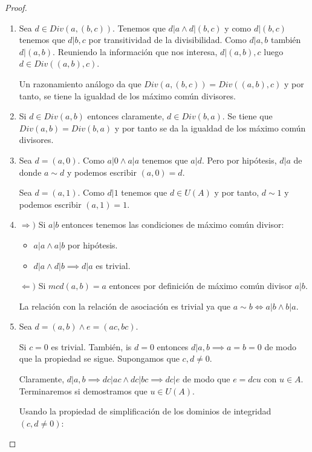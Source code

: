 \begin{proof}
	\begin{enumerate}
	\item Sea $d \in Div(a,(b,c))$. Tenemos que $d|a \land d|(b,c)$ y como $d|(b,c)$ tenemos que $d|b,c$ por transitividad de la divisibilidad. Como $d|a,b$ también $d|(a,b)$. Reuniendo la información que nos interesa, $d|(a,b),c$ luego $d \in Div((a,b),c)$. 
	
	Un razonamiento análogo da que $Div(a,(b,c)) = Div((a,b),c)$ y por tanto, se tiene la igualdad de los máximo común divisores. 
	 
	\item Si $d \in Div(a,b)$ entonces claramente, $d \in Div(b,a)$. Se tiene que $Div(a,b) = Div(b,a)$ y por tanto se da la igualdad de los máximo común divisores. 
	
	\item Sea $d = (a,0)$. Como $a|0 \land a|a$ tenemos que $a|d$. Pero por hipótesis, $d|a$ de donde $a \sim d$ y podemos escribir $(a,0) = d$. 
		
	Sea  $d = (a,1)$. Como $d|1$ tenemos que $d \in U(A)$ y por tanto, $d \sim 1$ y podemos escribir $(a,1) = 1$.
	
	\item $\Rightarrow)$ Si $a|b$ entonces tenemos las condiciones de máximo común divisor:
	
	\begin{itemize}
	\item $a|a \land a|b$ por hipótesis. 
	\item $d|a \land d|b \implies d|a$ es trivial.
	\end{itemize}
	
	$\Leftarrow)$ Si $mcd(a,b) = a$ entonces por definición de máximo común divisor $a|b$. 
	
	La relación con la relación de asociación es trivial ya que $a \sim b \iff a|b \land b|a$. 
	
	\item Sea $d = (a,b) \land e = (ac,bc)$. 
	
	Si $c = 0$ es trivial.  También, is $d = 0$ entonces $d|a,b \implies a = b = 0$ de modo que la propiedad se sigue. Supongamos que $c,d \neq 0$.
	
	Claramente, $d|a,b \implies dc|ac \land dc|bc \implies dc|e$ de modo que $e = dcu$ con $u \in A$. Terminaremos si demostramos que $u \in U(A)$.
	
	Usando la propiedad de simplificación de los dominios de integridad $(c,d \neq 0)$:
	

\end{enumerate}
\end{proof}
